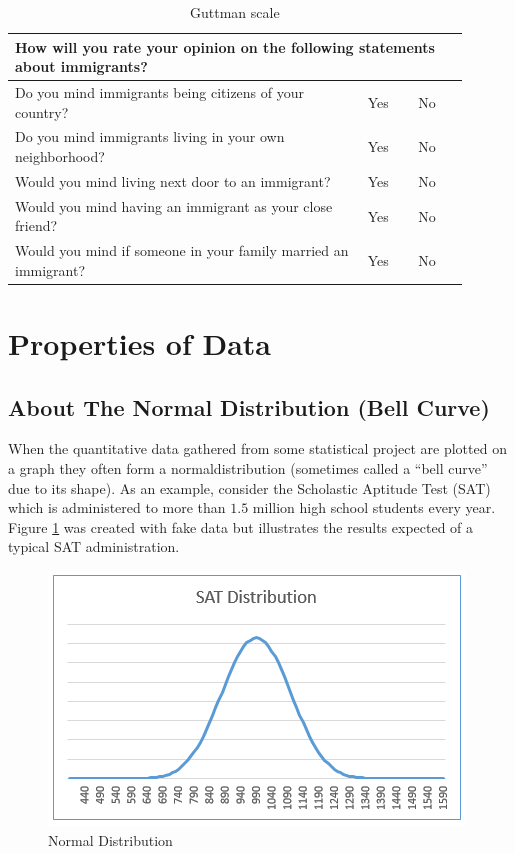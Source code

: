 \begin{description}
	\begin{table}[H]
		\centering
		\begin{tabularx}{0.95\linewidth}{p{0.70\linewidth}p{0.10\linewidth}p{0.10\linewidth}}
			\toprule
			\multicolumn{3}{p{0.95\linewidth}}{How will you rate your opinion on the following statements about immigrants?} \\	
			\midrule
			Do you mind immigrants being citizens of your country? & Yes & No \\
			Do you mind immigrants living in your own neighborhood? & Yes & No \\
			Would you mind living next door to an immigrant? & Yes & No \\
			Would you mind having an immigrant as your close friend? & Yes & No \\
			Would you mind if someone in your family married an immigrant? & Yes & No \\		
			\bottomrule
		\end{tabularx}
		\caption{Guttman scale}
		\label{tab06.05}
	\end{table}
	
\end{description}



\section{Properties of Data}

\subsection{About The Normal Distribution (Bell Curve)}

When the quantitative data gathered from some statistical project are plotted on a graph they often form a \gls{normaldistribution} (sometimes called a ``bell curve'' due to its shape). As an example, consider the Scholastic Aptitude Test (SAT) which is administered to more than $ 1.5 $ million high school students every year. Figure \ref{fig06.01} was created with fake data but illustrates the results expected of a typical SAT administration.

\begin{figure}[H]
	\centering
	\includegraphics[width=\maxwidth{.95\linewidth}]{gfx/06-SATDistro}
	\caption{Normal Distribution}
	\label{fig06.01}
\end{figure}

